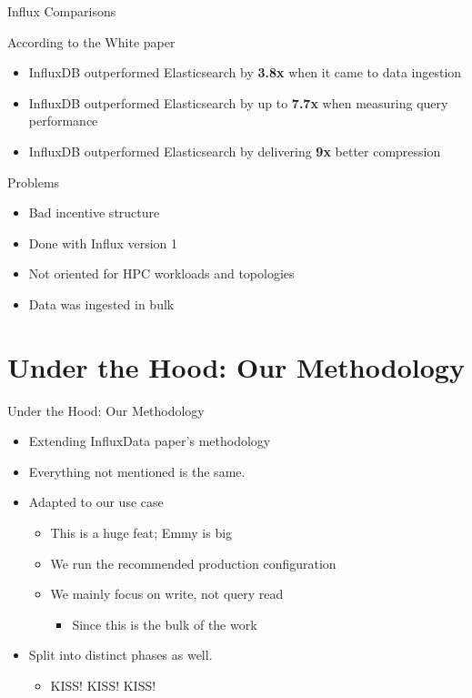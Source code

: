 \documentclass[compress,aspectratio=169]{beamer}
\begin{document}
\begin{frame}{Influx Comparisons}
\begin{block}{According to the White paper}
  \begin{itemize}
    \item InfluxDB outperformed Elasticsearch by \textbf{3.8x} when it came to data ingestion
    \item InfluxDB outperformed Elasticsearch by up to \textbf{7.7x} when measuring query performance
    \item InfluxDB outperformed Elasticsearch by delivering \textbf{9x} better compression
  \end{itemize}
\end{block}
\pause
\begin{block}{Problems}
\begin{itemize}
  \item Bad incentive structure
  \item Done with Influx version 1
  \item Not oriented for HPC workloads and topologies
  \item Data was ingested in bulk
\end{itemize}
\end{block}
\end{frame}

\section[Methodology]{Under the Hood: Our Methodology}
\begin{frame}{Under the Hood: Our Methodology}
  \begin{itemize}
    \item Extending InfluxData paper's methodology
    \item Everything not mentioned is the same.
    \item Adapted to our use case
    \begin{itemize}
      \item This is a huge feat; Emmy is big
      \item We run the recommended production configuration
      \item We mainly focus on write, not query read
      \begin{itemize}
        \item Since this is the bulk of the work
      \end{itemize}
    \end{itemize}
  \item Split into distinct phases as well.
    \begin{itemize}
      \item KISS! KISS! KISS!
    \end{itemize}
  \end{itemize}
\end{frame}
\end{document}
